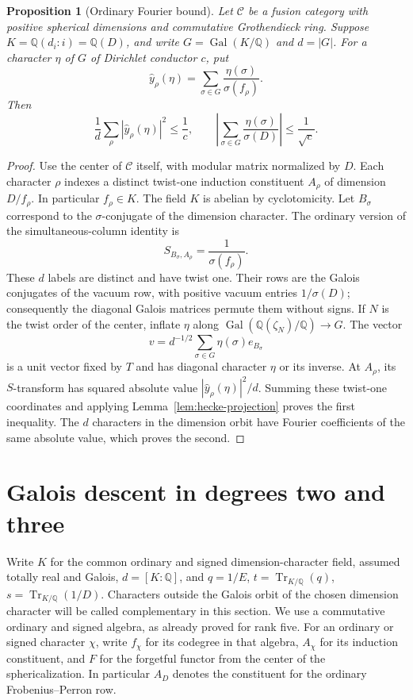 \documentclass[11pt,a4paper]{article}
\newtheorem{proposition}[theorem]{Proposition}
\numberwithin{equation}{section}
\begin{document}
\begin{proposition}[Ordinary Fourier bound]
\label{prop:ordinary-fourier}
Let $\mathcal C$ be a fusion category with positive spherical dimensions
and commutative Grothendieck ring. Suppose
$K=\mathbb Q(d_i:i)=\mathbb Q(D)$, and write
$G=\operatorname{Gal}(K/\mathbb Q)$ and $d=|G|$.
For a character $\eta$ of $G$ of Dirichlet conductor $c$, put
\[
 \widehat y_\rho(\eta)=
 \sum_{\sigma\in G}\frac{\eta(\sigma)}{\sigma(f_\rho)}.
\]
Then
\[
 \frac1d\sum_\rho|\widehat y_\rho(\eta)|^2\le\frac1c,
 \qquad
 \left|\sum_{\sigma\in G}\frac{\eta(\sigma)}{\sigma(D)}\right|
 \le\frac1{\sqrt c}.
\]
\end{proposition}
\begin{proof}
Use the center of $\mathcal C$ itself, with modular matrix normalized
by $D$. Each character $\rho$ indexes a distinct twist-one induction
constituent $A_\rho$ of dimension $D/f_\rho$. In particular
$f_\rho\in K$. The field $K$ is abelian by cyclotomicity.
Let $B_\sigma$ correspond to the $\sigma$-conjugate of the dimension
character. The ordinary version of the simultaneous-column identity is
\[
 S_{B_\sigma,A_\rho}=\frac1{\sigma(f_\rho)}.
\]
These $d$ labels are distinct and have twist one. Their rows are the
Galois conjugates of the vacuum row, with positive vacuum entries
$1/\sigma(D)$; consequently the diagonal Galois matrices permute
them without signs. If $N$ is the twist order of the center, inflate
$\eta$ along $\operatorname{Gal}(\mathbb Q(\zeta_N)/\mathbb Q)\to G$.
The vector
\[
 v=d^{-1/2}\sum_{\sigma\in G}\eta(\sigma)e_{B_\sigma}
\]
is a unit vector fixed by $T$ and has diagonal character $\eta$ or its
inverse. At $A_\rho$, its $S$-transform has squared absolute value
$|\widehat y_\rho(\eta)|^2/d$. Summing these twist-one coordinates and
applying Lemma~\ref{lem:hecke-projection} proves the first inequality.
The $d$ characters in the dimension orbit have Fourier coefficients
of the same absolute value, which proves the second.
\end{proof}


\section{Galois descent in degrees two and three}
\label{sec:cubic-permutation}

Write $K$ for the common ordinary and signed dimension-character field,
assumed totally real and Galois, $d=[K:\mathbb Q]$, and
$q=1/E$, $t=\operatorname{Tr}_{K/\mathbb Q}(q)$,
$s=\operatorname{Tr}_{K/\mathbb Q}(1/D)$.
Characters outside the Galois orbit of the chosen dimension character
will be called complementary in this section. We use a commutative
ordinary and signed algebra, as already proved for rank five. For an
ordinary or signed character $\chi$, write $f_\chi$ for its codegree in
that algebra, $A_\chi$ for its induction constituent, and $F$ for the
forgetful functor from the center of the sphericalization. In particular
$A_D$ denotes the constituent for the ordinary Frobenius--Perron row.
\end{document}
